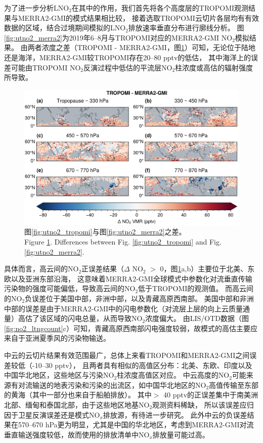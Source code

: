 为了进一步分析LNO$_2$在其中的作用，我们首先将各个高度层的TROPOMI观测结果与MERRA2-GMI的模式结果相比较，
接着选取TROPOMI云切片各层均有有效数据的区域，结合过境期间模拟的LNO$_2$排放速率垂直分布进行廓线分析。
图\ref{fig:utno2_merra2}为2019年6--8月与TROPOMI对应的MERRA2-GMI NO$_2$模拟结果。
由两者浓度之差（TROPOMI - MERRA2-GMI，图\ref{fig:utno2_delta}）可知，无论位于陆地还是海洋，MERRA2-GMI较TROPOMI存在20--80 pptv的低估，
其中海洋上的误差可能由TROPOMI NO$_2$反演过程中低估的平流层NO$_2$柱浓度或高估的辐射强度所导致\citep{VanGeffen.2020}。

\begin{figure}[!htbp]
    \centering
    \includegraphics[width=14cm]{./figures/utno2_delta.png}
    \caption{
    图\ref{fig:utno2_tropomi}与图\ref{fig:utno2_merra2}之差。 \\
    Figure \ref{fig:utno2_delta}. Differences between Fig. \ref{fig:utno2_tropomi} and Fig. \ref{fig:utno2_merra2}.
    }
    \label{fig:utno2_delta}
\end{figure}


具体而言，高云间的NO$_2$正误差结果（$\Delta$ NO$_2$ $>$ 0，图\ref{fig:utno2_delta}a,b）主要位于北美、东欧以及亚洲东部沿海，
这意味着MERRA2-GMI全球模式中参数化对流垂直传输污染物的强度可能偏低，导致高云间的NO$_2$低于TROPOMI的观测值。
而高云间的NO$_2$负误差位于美国中部，非洲中部，以及青藏高原西南部。
美国中部和非洲中部的误差是由于MERRA2-GMI中的闪电参数化（对流层上层的向上云质量通量）高估了该区域的闪电总量，从而导致NO$_2$浓度偏大\citep{Allen.2002,Allen.2010}。
由LIS/OTD数据（图\ref{fig:no2_ltngcount}c）可知，青藏高原西南部闪电强度较弱，故模式的高估主要应来自于亚洲夏季风的污染物输送。

中云的云切片结果有效范围最广，总体上来看TROPOMI和MERRA2-GMI之间误差较低（-10--30 pptv），
且两者具有相似的高值区分布：北美、东欧、印度以及中国华北地区，这些地区与污染NO$_2$柱浓度高值区对应。
中云高度的NO$_2$可能来源有对流输送的地表污染和污染的出流区，如中国华北地区的NO$_2$高值传输至东部的黄海（其中一部分也来自于船舶排放）。
其中$>$ 40 pptv的正误差集中于南美洲北部、缅甸和泰国北部，由于这些地区地基NO$_2$观测资料稀缺，
所以该误差应归因于卫星反演误差还是模式NO$_x$排放源，有待进一步研究。
此外中云的负误差结果在570--670 hPa更为明显，尤其是中国的华北地区，考虑到MERRA2-GMI对流垂直输送强度较低，故而使用的排放清单中NO$_x$排放量可能过高\citep{Ziemke.2019}。

